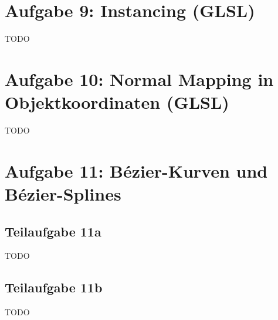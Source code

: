\documentclass[a4paper]{scrartcl}
\begin{document}
\section*{Aufgabe 9: Instancing (GLSL)}
TODO

\section*{Aufgabe 10: Normal Mapping in Objektkoordinaten (GLSL)}
TODO

\section*{Aufgabe 11: Bézier-Kurven und Bézier-Splines}
\subsection*{Teilaufgabe 11a}
TODO
\subsection*{Teilaufgabe 11b}
TODO
\end{document}
